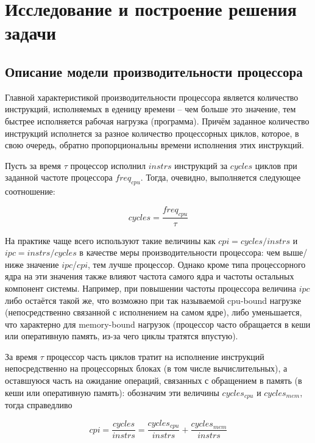 \section{Исследование и построение решения задачи}
\label{sec:Section3} 

\subsection{Описание модели производительности процессора}

    Главной характеристикой производительности процессора является количество инструкций,
    исполняемых в еденицу времени -- чем больше это значение, тем быстрее исполняется рабочая
    нагрузка (программа). Причём заданное количество инструкций исполнется за разное количество
    процессорных циклов, которое, в свою очередь, обратно пропорциональны времени исполнения
    этих инструкций.

    Пусть за время $\tau$ процессор исполнил $instrs$ инструкций за $cycles$ циклов при заданной
    частоте процессора $freq_{cpu}$. Тогда, очевидно, выполняется следующее соотношение:

    \begin{equation} \label{cycles_base}
        cycles = \frac{freq_{cpu}}{\tau}
    \end{equation}

    На практике чаще всего используют такие величины как $cpi = cycles / instrs$ и
    $ipc = instrs / cycles$ в качестве меры производительности процессора: чем выше/ниже значение
    $ipc$/$cpi$, тем лучше процессор. Однако кроме типа процессорного ядра на эти значения также
    влияют частота самого ядра и частоты остальных компонент системы. Например, при повышении частоты
    процессора величина $ipc$ либо остаётся такой же, что возможно при так называемой cpu-bound
    нагрузке (непосредственно связанной с исполнением на самом ядре), либо уменьшается, что
    характерно для memory-bound нагрузок (процессор часто обращается в кеши или оперативную память,
    из-за чего циклы тратятся впустую).

    За время $\tau$ процессор часть циклов тратит на исполнение инструкций непосредственно на
    процессорных блоках (в том числе вычислительных), а оставшуюся часть на ожидание операций,
    связанных с обращением в память (в кеши или оперативную память): обозначим эти величины
    $cycles_{cpu}$ и $cycles_{mem}$, тогда справедливо

    \begin{equation}
        cpi = \frac{cycles}{instrs} = \frac{cycles_{cpu}}{instrs} + \frac{cycles_{mem}}{instrs}
    \end{equation}

